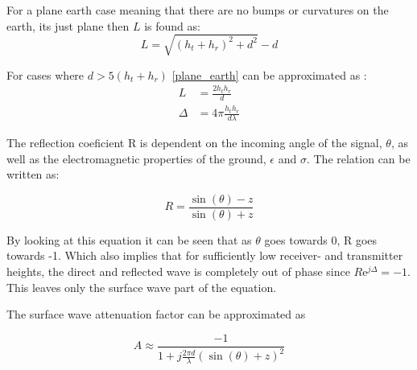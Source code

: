 For a plane earth case meaning that there are no bumps or curvatures on the earth, its just plane then $L$ is found as:
\begin{equation}
L=\sqrt{(h_t+h_r)^2+d^2}-d
\label{plane_earth}
\end{equation}
\begin{where}
\end{where}

For cases where $d > 5(h_t+h_r)$ \autoref{plane_earth} can be approximated as \citep{Bullington}:
\begin{align}
L &=\frac{2h_th_r}{d} \\
\Delta &= 4\pi\frac{h_th_r}{d\lambda}
\end{align}

The reflection coeficient R is dependent on the incoming angle of the signal, $\theta$, as well as the electromagnetic properties of the ground, $\epsilon$ and $\sigma$. The relation can be written as\citep{Bullington}:

\begin{equation}
R=\frac{\sin(\theta)-z}{\sin(\theta)+z}
\end{equation}
\begin{where}
\end{where}

By looking at this equation it can be seen that as $\theta$ goes towards 0, R goes towards -1. Which also implies that for sufficiently low receiver- and transmitter heights, the direct and reflected wave is completely out of phase since $R\text{e}^{j\Delta} = -1$. This leaves only the surface wave part of the equation.

The surface wave attenuation factor can be approximated as\citep{Bullington}

\begin{equation}
A\approx\frac{-1}{1+j\frac{2\pi d}{\lambda}\left(\sin(\theta)+z\right)^2}
\end{equation}

